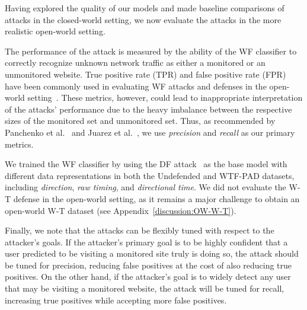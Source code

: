 \documentclass[USenglish,oneside,twocolumn]{article}
\begin{document}
Having explored the quality of our models and made baseline comparisons of attacks in the closed-world setting, we now evaluate the attacks in the more realistic open-world setting. 

The performance of the attack is measured by the ability of the WF classifier to correctly recognize unknown network traffic as either a monitored or an unmonitored website. True positive rate (TPR) and false positive rate (FPR) have been commonly used in evaluating WF attacks and defenses in the open-world setting~\cite{wang2014effective, hayes2016k, Rimmer2018}. These metrics, however, could lead to inappropriate interpretation of the attacks' performance due to the heavy imbalance between the respective sizes of the monitored set and unmonitored set. Thus, as recommended by Panchenko et al.~\cite{panchenko2011website} and Juarez et al.~\cite{Juarez2014}, we use \emph{precision} and \emph{recall} as our primary metrics.



We trained the WF classifier by using the DF attack~\cite{Sirinam2018} as the base model with different data representations in both the Undefended and WTF-PAD datasets, including \emph{direction}, \emph{raw timing}, and \emph{directional time}. We did not evaluate the W-T defense in the open-world setting, as it remains a major challenge to obtain an open-world W-T dataset (see Appendix~\ref{discussion:OW-W-T}).


Finally, we note that the attacks can be flexibly tuned with respect to the attacker's goals. If the attacker's primary goal is to be highly confident that a user predicted to be visiting a monitored site truly is doing so, the attack should be tuned for precision, reducing false positives at the cost of also reducing true positives. On the other hand, if the attacker's goal is to widely detect any user that may be visiting a monitored website, the attack will be tuned for recall, increasing true positives while accepting more false positives. 
\end{document}
